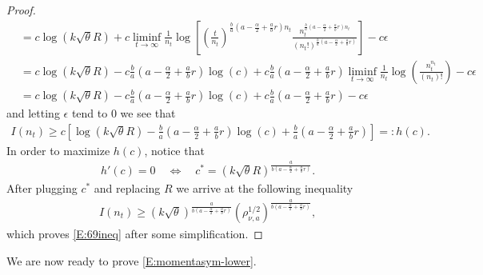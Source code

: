 \documentclass[12pt]{report}
\theoremstyle{plain}
\theoremstyle{definition}
\numberwithin{equation}{section}
\begin{document}
\begin{proof}
\begin{align*}
	& = c \log(k \sqrt{\theta}R) + c \liminf_{t \to \infty} \frac{1}{n_t} \log \left[  \left(\frac{t}{n_t}\right)^{\frac{b}{a}\left(a-\frac{\alpha}{2} + \frac{a}{b}r\right)n_t} \frac{ n_t^{\frac{b}{a}\left( a- \frac{\alpha}{2} + \frac{a}{b}r \right)n_t } } { (n_t!)^{\frac{b}{a}\left( a - \frac{\alpha}{2} + \frac{a}{b}r \right) } }\right] - c \epsilon \\
	& = c \log(k \sqrt{\theta}R) - c\frac{b}{a}\left( a - \frac{\alpha}{2} + \frac{a}{b}r \right) \log(c) + c\frac{b}{a}\left( a - \frac{\alpha}{2} + \frac{a}{b}r \right) \liminf_{t \to \infty} \frac{1}{n_t}\log\left(\frac{n_t^{n_t}}{(n_t)!}\right) - c\epsilon                                                                                             \\
	& = c \log(k \sqrt{\theta}R) - c\frac{b}{a}\left( a - \frac{\alpha}{2} + \frac{a}{b}r \right) \log(c) + c\frac{b}{a}\left( a - \frac{\alpha}{2} + \frac{a}{b}r \right)  - c\epsilon
	\end{align*}
	and letting $\epsilon$ tend to $0$ we see that
	\begin{align*}
	I(n_t) \ge c \left[ \log(k \sqrt{\theta}R) - \frac{b}{a}\left( a - \frac{\alpha}{2} + \frac{a}{b}r \right) \log(c) + \frac{b}{a}\left( a - \frac{\alpha}{2} + \frac{a}{b}r \right) \right] =: h(c).
	\end{align*}
	In order to maximize $h(c)$, notice that
	\begin{align*}
	h'(c) = 0 \quad \Longleftrightarrow  \quad  c^*=(k \sqrt{\theta}R)^{\frac{a}{b\left( a - \frac{\alpha}{2} + \frac{a}{b}r \right)}}.
	\end{align*}
	After plugging $c^*$ and replacing $R$ we arrive at the following inequality
	\begin{align*}
	I(n_t) \ge (k\sqrt{\theta})^{\frac{a}{b\left( a - \frac{\alpha}{2} + \frac{a}{b}r \right)} }(\rho_{\nu,a}^{1/2})^{\frac{a}{b\left( a - \frac{\alpha}{2} + \frac{a}{b}r \right)}},
	\end{align*}
	which proves \eqref{E:69ineq} after some simplification.
\end{proof}


We are now ready to prove \eqref{E:momentasym-lower}.
\end{document}

